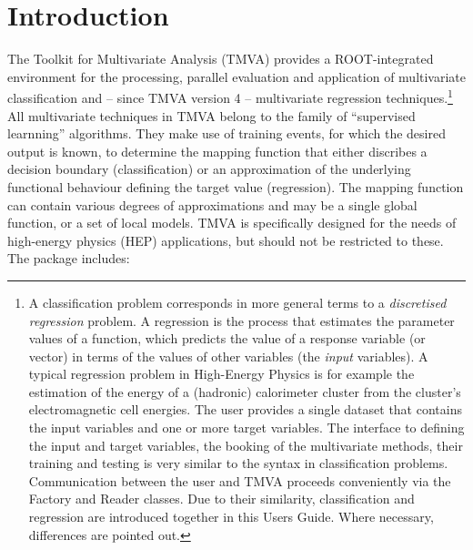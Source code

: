 \section{Introduction}
\label{sec:introduction}

The Toolkit for Multivariate Analysis (TMVA) provides a ROOT-integrated~\cite{ROOT} 
environment for the processing, parallel evaluation and application of multivariate 
classification and -- since TMVA version 4 -- multivariate regression techniques.\footnote
{
   A classification problem corresponds in more general terms to a 
   {\em discretised regression} problem. A regression is the 
   process that estimates the parameter values of a function, which
   predicts the value of a response variable (or vector)
   in terms of the values of other variables (the {\em input} variables). 
   A typical regression problem in High-Energy Physics is for example the estimation of
   the energy of a (hadronic) calorimeter cluster from the cluster's electromagnetic 
   cell energies. The user provides a single dataset that contains the input variables 
   and one or more target variables. The interface to defining the input and target variables,
   the booking of the multivariate methods, their training and testing is very similar to 
   the syntax in classification problems. Communication between the user and TMVA proceeds
   conveniently via the Factory and Reader classes. Due to their similarity, classification 
   and regression are introduced together in this Users Guide. Where necessary, 
   differences are pointed out.
}
All multivariate techniques in TMVA belong to the family of ``supervised learnning'' algorithms.
They make use of training events, for which the desired output is known, to determine 
the mapping function that either discribes a decision boundary (classification)
or an approximation of the underlying functional behaviour defining the target value (regression).
The mapping function can contain various degrees of approximations and may be a single global 
function, or a set of local models. 
TMVA is specifically designed for the needs of high-energy physics (HEP) applications, 
but should not be restricted to these. The package includes:
